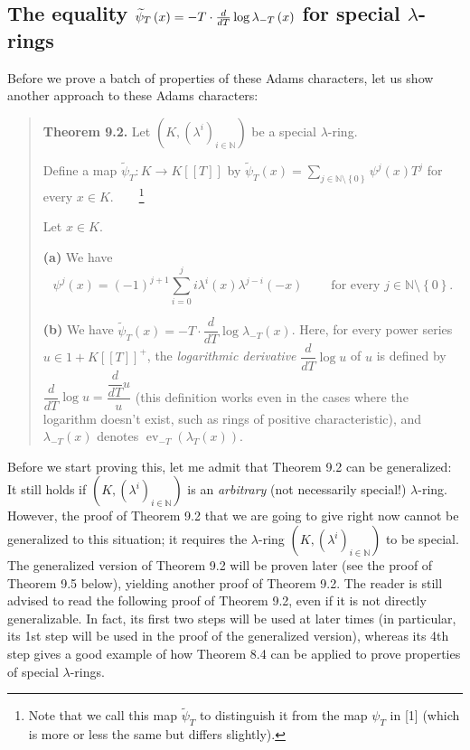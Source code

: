 \documentclass[numbers=enddot,12pt,final,onecolumn,notitlepage]{scrartcl}%
\begin{document}
\subsection{The equality $\protect\widetilde{\psi}_{T}\left(  x\right)  =
-T\cdot\frac{d}{dT}\log\lambda_{-T}\left(  x\right)  $ for special $\lambda
$-rings}

Before we prove a batch of properties of these Adams characters, let us show
another approach to these Adams characters:

\begin{quote}
\textbf{Theorem 9.2.} Let $\left(  K,\left(  \lambda^{i}\right)
_{i\in\mathbb{N}}\right)  $ be a special $\lambda$-ring.

Define a map $\widetilde{\psi}_{T}:K\rightarrow K\left[  \left[  T\right]
\right]  $ by $\widetilde{\psi}_{T}\left(  x\right)  =\sum\limits_{j\in
\mathbb{N}\setminus\left\{  0\right\}  }\psi^{j}\left(  x\right)  T^{j}$ for
every $x\in K$.\ \ \ \ \footnote{Note that we call this map $\widetilde{\psi
}_{T}$ to distinguish it from the map $\psi_{T}$ in [1] (which is more or less
the same but differs slightly).}

Let $x\in K$.

\textbf{(a)} We have%
\[
\psi^{j}\left(  x\right)  =\left(  -1\right)  ^{j+1}\sum_{i=0}^{j}i\lambda
^{i}\left(  x\right)  \lambda^{j-i}\left(  -x\right)
\ \ \ \ \ \ \ \ \ \ \text{for every }j\in\mathbb{N}\setminus\left\{
0\right\}  \text{.}%
\]


\textbf{(b)} We have $\widetilde{\psi}_{T}\left(  x\right)  =-T\cdot\dfrac
{d}{dT}\log\lambda_{-T}\left(  x\right)  $. Here, for every power series
$u\in1+K\left[  \left[  T\right]  \right]  ^{+}$, the \textit{logarithmic
derivative} $\dfrac{d}{dT}\log u$ of $u$ is defined by $\dfrac{d}{dT}\log
u=\dfrac{\dfrac{d}{dT}u}{u}$ (this definition works even in the cases where
the logarithm doesn't exist, such as rings of positive characteristic), and
$\lambda_{-T}\left(  x\right)  $ denotes $\operatorname*{ev}_{-T}\left(
\lambda_{T}\left(  x\right)  \right)  $.
\end{quote}

Before we start proving this, let me admit that Theorem 9.2 can be
generalized: It still holds if $\left(  K,\left(  \lambda^{i}\right)
_{i\in\mathbb{N}}\right)  $ is an \textit{arbitrary} (not necessarily
special!) $\lambda$-ring. However, the proof of Theorem 9.2 that we are going
to give right now cannot be generalized to this situation; it requires the
$\lambda$-ring $\left(  K,\left(  \lambda^{i}\right)  _{i\in\mathbb{N}%
}\right)  $ to be special. The generalized version of Theorem 9.2 will be
proven later (see the proof of Theorem 9.5 below), yielding another proof of
Theorem 9.2. The reader is still advised to read the following proof of
Theorem 9.2, even if it is not directly generalizable. In fact, its first two
steps will be used at later times (in particular, its 1st step will be used in
the proof of the generalized version), whereas its 4th step gives a good
example of how Theorem 8.4 can be applied to prove properties of special
$\lambda$-rings.
\end{document}
